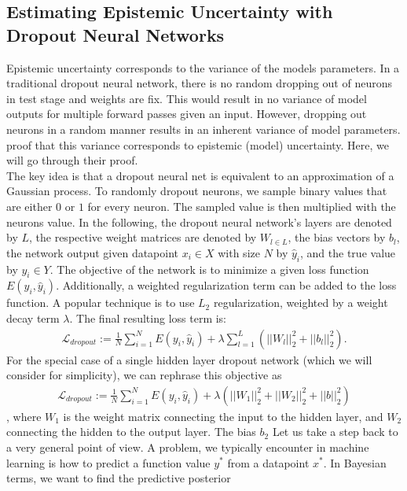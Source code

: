 \documentclass[a4paper,cleardoubleempty,BCOR1cm, 11pt]{report}
\begin{document}
\subsection{Estimating Epistemic Uncertainty with Dropout Neural Networks}\label{sec:dropoutuncertainty}
Epistemic uncertainty corresponds to the variance of the models parameters.
In a traditional dropout neural network, there is no random dropping out of neurons in test stage and weights are fix. This would result in no variance of model outputs for multiple forward passes given an input. However, dropping out neurons in a random manner results in an inherent variance of model parameters. \citet{gal2016dropout} proof that this variance corresponds to epistemic (model) uncertainty. Here, we will go through their proof.\\
The key idea is that a dropout neural net is equivalent to an approximation of a Gaussian process. To randomly dropout neurons, we sample binary values that are either $0$ or $1$ for every neuron. The sampled value is then multiplied with the neurons value.
In the following, the dropout neural network's layers are denoted by $L$, the respective weight matrices are denoted by $W_{l \in L}$, the bias vectors by $b_l$, the network output given datapoint $x_i \in X$ with size $N$ by $\hat{y}_i$, and the true value by $y_i \in Y$. The objective of the network is to minimize a given loss function $E(y_i, \hat{y}_i)$. Additionally, a weighted regularization term can be added to the loss function. A popular technique is to use $L_2$ regularization, weighted by a weight decay term $\lambda$. The final resulting loss term is:
\begin{align*}
\mathcal{L}_{dropout} := \frac{1}{N}\sum_{i=1}^{N}E(y_i, \hat{y}_i) + \lambda \sum_{l=1}^{L}(||W_l||^2_2 + ||b_l||^2_2).
\end{align*}
For the special case of a single hidden layer dropout network (which we will consider for simplicity), we can rephrase this objective as
\begin{align}\label{eq:dropout}
\mathcal{L}_{dropout} := \frac{1}{N}\sum_{i=1}^{N}E(y_i, \hat{y}_i) + \lambda (||W_1||^2_2 + ||W_2||^2_2+ ||b||^2_2)
\end{align}, where $W_1$ is the weight matrix connecting the input to the hidden layer, and $W_2$ connecting the hidden to the output layer. The bias $b_2$ 
Let us take a step back to a very general point of view. A problem, we typically encounter in machine learning is how to predict a function value $y^*$ from a datapoint $x^*$. In Bayesian terms, we want to find the predictive posterior
\end{document}
